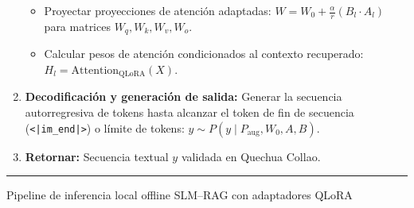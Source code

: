 \begin{algoritmo}[H]
\begin{minipage}{0.96\textwidth}
\begin{enumerate}[1.]
    \begin{itemize}
        \item Proyectar proyecciones de atención adaptadas: $W = W_0 + \frac{\alpha}{r}(B_l \cdot A_l)$ para matrices $W_q, W_k, W_v, W_o$.
        \item Calcular pesos de atención condicionados al contexto recuperado: $H_l = \text{Attention}_{\text{QLoRA}}(X)$.
    \end{itemize}
    \item \textbf{Decodificación y generación de salida:} Generar la secuencia autorregresiva de tokens hasta alcanzar el token de fin de secuencia (\texttt{<|im\_end|>}) o límite de tokens: $y \sim P(y \mid P_{\text{aug}}, W_0, A, B)$.
    \item \textbf{Retornar:} Secuencia textual $y$ validada en Quechua Collao.
\end{enumerate}
\vspace{4pt}\hrule height 0.8pt\vspace{2pt}
\end{minipage}
\caption{Pipeline de inferencia local offline SLM--RAG con adaptadores QLoRA}
\label{alg:pipeline_rag_qlora}
\end{algoritmo}

